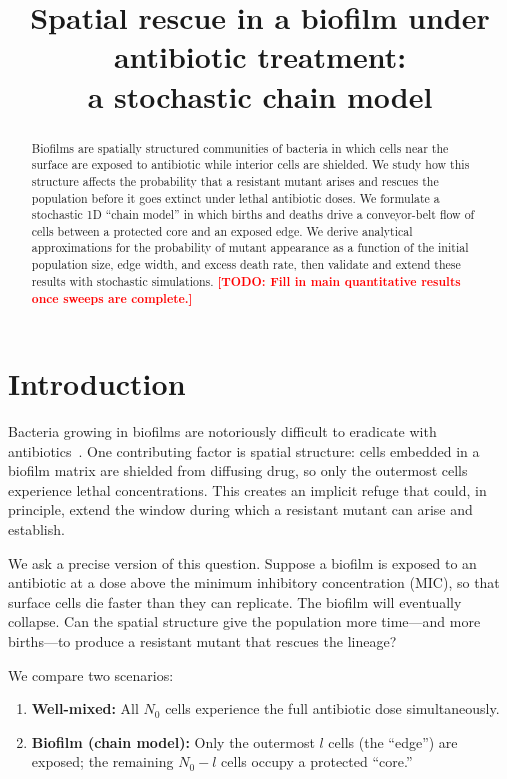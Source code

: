 \documentclass[12pt]{article}
\title{Spatial rescue in a biofilm under antibiotic treatment:\\
a stochastic chain model}
\author{}
\date{}
\newcommand{\TODO}[1]{\textcolor{red}{\textbf{[TODO: #1]}}}
\begin{document}
\maketitle

\begin{abstract}
Biofilms are spatially structured communities of bacteria in which cells near
the surface are exposed to antibiotic while interior cells are shielded. We
study how this structure affects the probability that a resistant mutant arises
and rescues the population before it goes extinct under lethal antibiotic
doses. We formulate a stochastic 1D ``chain model'' in which births and deaths
drive a conveyor-belt flow of cells between a protected core and an exposed
edge. We derive analytical approximations for the probability of mutant
appearance as a function of the initial population size, edge width, and
excess death rate, then validate and extend these results with stochastic
simulations. \TODO{Fill in main quantitative results once sweeps are complete.}
\end{abstract}

\section{Introduction}
\label{sec:intro}

Bacteria growing in biofilms are notoriously difficult to eradicate with
antibiotics~\cite{costerton1999}. One contributing factor is spatial structure:
cells embedded in a biofilm matrix are shielded from diffusing drug, so only the
outermost cells experience lethal concentrations. This creates an implicit refuge
that could, in principle, extend the window during which a resistant mutant can
arise and establish.

We ask a precise version of this question. Suppose a biofilm is exposed to an
antibiotic at a dose above the minimum inhibitory concentration (MIC), so that
surface cells die faster than they can replicate. The biofilm will eventually
collapse. Can the spatial structure give the population more time---and more
births---to produce a resistant mutant that rescues the lineage?

We compare two scenarios:
\begin{enumerate}
    \item \textbf{Well-mixed:} All $N_0$ cells experience the full antibiotic
        dose simultaneously.
    \item \textbf{Biofilm (chain model):} Only the outermost $l$ cells
        (the ``edge'') are exposed; the remaining $N_0 - l$ cells occupy a
        protected ``core.''
\end{enumerate}
\end{document}
